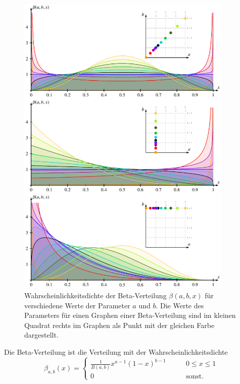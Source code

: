 \begin{figure}
\centering
\includegraphics[width=0.92\textwidth]{chapters/040-rekursion/images/beta.pdf}
\caption{Wahrscheinlichkeitsdichte der Beta-Verteilung
$\beta(a,b,x)$
für verschiedene Werte der Parameter $a$ und $b$.
Die Werte des Parameters für einen Graphen einer Beta-Verteilung
sind im kleinen Quadrat rechts im Graphen
als Punkt mit der gleichen Farbe dargestellt.
\label{buch:rekursion:ordnung:fig:betaverteilungn}}
\end{figure}

\begin{definition}
\label{buch:rekursion:beta:def}
Die Beta-Verteilung ist die Verteilung mit der Wahrscheinlichkeitsdichte
\begin{equation}
\beta_{a,b}(x)
=
\begin{cases}
\displaystyle
\frac{1}{B(a,b)}
x^{a-1}(1-x)^{b-1}&\qquad 0\le x \le 1\\
0&\qquad\text{sonst.}
\end{cases}
\label{buch:rekursion:beta:eqn:def}
\end{equation}
\end{definition}

